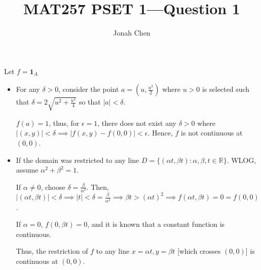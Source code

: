 \documentclass{exam}
\title{MAT257 PSET 1---Question 1}
\author{Jonah Chen}
\numberwithin{equation}{section}
\newcommand{\R}{\mathbb{R}}
\begin{document}
    \sffamily
    Let $f=\mathbf 1_A$

    \begin{itemize}
        \item     For any $\delta>0$, consider the point $a=\left(u,\frac{u^2}{2}\right)$ where $u>0$ is selected such that $\delta=2\sqrt{u^2+\frac{u^4}{4}}$ so that $|a|<\delta$. 
    
        $f(a)=1$, thus, for $\epsilon=1$, there does not exist any $\delta>0$ where $|(x,y)|<\delta\implies |f(x,y)-f(0,0)|<\epsilon$. Hence, $f$ is not continuous at $(0,0)$.
        \item If the domain was restricted to any line $D=\{(\alpha t, \beta t):\alpha,\beta,t\in\R\}$. WLOG, assume $\alpha^2+\beta^2=1$. 
    
        If $\alpha\neq 0$, choose $\delta=\frac{\beta}{\alpha^2}$. Then, $|(\alpha t,\beta t)|<\delta\implies |t|<\delta=\frac{\beta}{\alpha^2}\implies\beta t>(\alpha t)^2\implies f(\alpha t,\beta t)=0=f(0,0)$.
        
        If $\alpha=0$, $f(0,\beta t)=0$, and it is known that a constant function is continuous. 

        Thus, the restriction of $f$ to any line $x=\alpha t, y=\beta t$ [which crosses $(0,0)$] is continuous at $(0,0)$.  
    \end{itemize}


    
\end{document}
